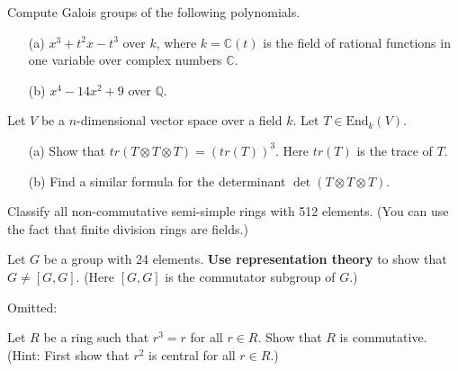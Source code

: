 \documentclass[openany]{book}
\begin{document}
\begin{prob}
    Compute Galois groups of the following polynomials.
    \begin{itemize}
        \item[(a)] \(x^3 + t^2x - t^3\) over \(k\), where \(k = \mathbb{C}(t)\) is the field of rational functions in one variable over complex numbers \(\mathbb{C}\).
        \item[(b)] \(x^4 - 14x^2 + 9\) over \(\mathbb{Q}\).
    \end{itemize}
\end{prob}



\begin{prob}
    Let \(V\) be a \(n\)-dimensional vector space over a field \(k\). Let \(T \in \text{End}_k(V)\).
    \begin{itemize}
        \item[(a)] Show that \(tr(T \otimes T \otimes T) = (tr(T))^3\). Here \(tr(T)\) is the trace of \(T\).
        \item[(b)] Find a similar formula for the determinant \(\det(T \otimes T \otimes T)\).
    \end{itemize}
\end{prob}



\begin{prob}
    Classify all non-commutative semi-simple rings with 512 elements. (You can use the fact that finite division rings are fields.)
\end{prob}


\begin{prob}
    Let \(G\) be a group with 24 elements. \textbf{Use representation theory} to show that \(G \neq [G, G]\). (Here \([G, G]\) is the commutator subgroup of \(G\).)
\end{prob}


Omitted:

\begin{prob}
    Let \(R\) be a ring such that \(r^3 = r\) for all \(r \in R\). Show that \(R\) is commutative. (Hint: First show that \(r^2\) is central for all \(r \in R\).)
\end{prob}
\end{document}
